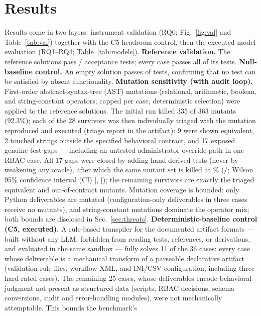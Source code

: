 \documentclass{ieeetj}
\begin{document}
\section{Results}
\label{sec:results}
Results come in two layers: instrument validation (RQ0; Fig.~\ref{fig:val} and
Table~\ref{tab:val}) together with the C5 headroom control, then the executed model
evaluation (RQ1--RQ4; Table~\ref{tab:models}).
\textbf{Reference validation.} The reference solutions pass \RefPassed/\RefTotal{} acceptance
tests; every case passes all of its tests.
\textbf{Null-baseline control.} An empty solution passes \NullPassed{} of \RefTotal{} tests,
confirming that no test can be satisfied by absent functionality.
\textbf{Mutation sensitivity (with audit loop).} First-order abstract-syntax-tree (AST)
mutations (relational, arithmetic, boolean, and string-constant operators; capped per case,
deterministic selection) were applied to the reference solutions. The initial run killed
335 of 363 mutants (92.3\%); each of the 28 survivors was then individually triaged with the
mutation reproduced and executed (triage report in the artifact): 9 were shown equivalent, 2
touched strings outside the specified behavioral contract, and 17 exposed genuine test gaps
--- including an untested administrator-override path in one RBAC case. All 17 gaps were
closed by adding hand-derived tests (never by weakening any oracle), after which the same
mutant set is killed at \KillRate\% (\MutantsKilled/\NumMutants; Wilson 95\% confidence
interval (CI) [\KillRateCILo, \KillRateCIHi]); the \SurvivingMutants{} remaining survivors are exactly
the triaged equivalent and out-of-contract mutants. Mutation
coverage is bounded: only Python deliverables are mutated (configuration-only deliverables in
three cases receive no mutants), and string-constant mutations dominate the operator mix; both
bounds are disclosed in Sec.~\ref{sec:threats}.
\textbf{Deterministic-baseline control (C5, executed).} A rule-based transpiler for the
documented artifact formats --- built without any LLM, forbidden from reading tests,
references, or derivations, and evaluated in the same sandbox --- fully solves 11 of the 36
cases: every case whose deliverable is a mechanical transform of a parseable declarative
artifact (validation-rule files, workflow XML, and INI/CSV configuration, including three
hard-rated cases). The remaining 25 cases, whose deliverables encode behavioral judgment not
present as structured data (scripts, RBAC decisions, schema conversions, audit and
error-handling modules), were not mechanically attemptable. This bounds the benchmark's
\end{document}
